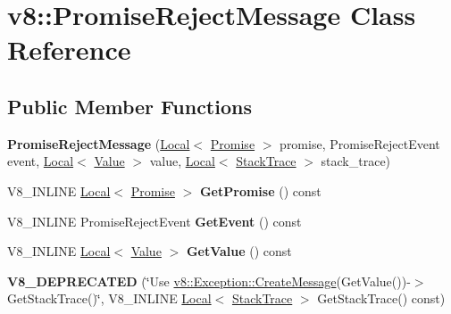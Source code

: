 \hypertarget{classv8_1_1_promise_reject_message}{}\section{v8\+:\+:Promise\+Reject\+Message Class Reference}
\label{classv8_1_1_promise_reject_message}
\subsection*{Public Member Functions}
\begin{DoxyCompactItemize}
\item 
{\bfseries Promise\+Reject\+Message} (\hyperlink{classv8_1_1_local}{Local}$<$ \hyperlink{classv8_1_1_promise}{Promise} $>$ promise, Promise\+Reject\+Event event, \hyperlink{classv8_1_1_local}{Local}$<$ \hyperlink{classv8_1_1_value}{Value} $>$ value, \hyperlink{classv8_1_1_local}{Local}$<$ \hyperlink{classv8_1_1_stack_trace}{Stack\+Trace} $>$ stack\+\_\+trace)\hypertarget{classv8_1_1_promise_reject_message_a052df173c75f1eb31b252714c88f3362}{}\label{classv8_1_1_promise_reject_message_a052df173c75f1eb31b252714c88f3362}

\item 
V8\+\_\+\+I\+N\+L\+I\+NE \hyperlink{classv8_1_1_local}{Local}$<$ \hyperlink{classv8_1_1_promise}{Promise} $>$ {\bfseries Get\+Promise} () const \hypertarget{classv8_1_1_promise_reject_message_a8582107385b66f911c6d4c9a17890222}{}\label{classv8_1_1_promise_reject_message_a8582107385b66f911c6d4c9a17890222}

\item 
V8\+\_\+\+I\+N\+L\+I\+NE Promise\+Reject\+Event {\bfseries Get\+Event} () const \hypertarget{classv8_1_1_promise_reject_message_a1380024500dac27eb74665701a80c6b0}{}\label{classv8_1_1_promise_reject_message_a1380024500dac27eb74665701a80c6b0}

\item 
V8\+\_\+\+I\+N\+L\+I\+NE \hyperlink{classv8_1_1_local}{Local}$<$ \hyperlink{classv8_1_1_value}{Value} $>$ {\bfseries Get\+Value} () const \hypertarget{classv8_1_1_promise_reject_message_ad87ec78d2e817b623d996f8db7d45ffc}{}\label{classv8_1_1_promise_reject_message_ad87ec78d2e817b623d996f8db7d45ffc}

\item 
{\bfseries V8\+\_\+\+D\+E\+P\+R\+E\+C\+A\+T\+ED} (\char`\"{}Use \hyperlink{classv8_1_1_exception_a05bdd41395488f34482eadaafc70b6cb}{v8\+::\+Exception\+::\+Create\+Message}(Get\+Value())-\/$>$Get\+Stack\+Trace()\char`\"{}, V8\+\_\+\+I\+N\+L\+I\+NE \hyperlink{classv8_1_1_local}{Local}$<$ \hyperlink{classv8_1_1_stack_trace}{Stack\+Trace} $>$ Get\+Stack\+Trace() const)\hypertarget{classv8_1_1_promise_reject_message_af768aa21023875a4037d797d1e91fe42}{}\label{classv8_1_1_promise_reject_message_af768aa21023875a4037d797d1e91fe42}

\end{DoxyCompactItemize}
